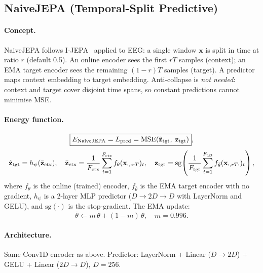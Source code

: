 \documentclass[11pt,a4paper]{article}
\begin{document}
\subsection{NaiveJEPA (Temporal-Split Predictive)}
\label{sec:math_naive}

\paragraph{Concept.}
NaiveJEPA follows I-JEPA~\cite{ijepa} applied to EEG: a single window $\mathbf{x}$
is split in time at ratio $r$ (default 0.5).  An online encoder sees the first $r T$
samples (context); an EMA target encoder sees the remaining $(1-r)T$ samples (target).
A predictor maps context embedding to target embedding.  Anti-collapse is \emph{not needed}:
context and target cover disjoint time spans, so constant predictions cannot minimise MSE.

\paragraph{Energy function.}
\begin{equation}
  \boxed{E_{\mathrm{NaiveJEPA}} = L_{\mathrm{pred}} = \mathrm{MSE}(\hat{\mathbf{z}}_{\rm tgt},\;
    \mathbf{z}_{\rm tgt})},
\end{equation}
\begin{equation}
  \hat{\mathbf{z}}_{\rm tgt} = h_\psi(\bar{\mathbf{z}}_{\rm ctx}), \quad
  \bar{\mathbf{z}}_{\rm ctx} = \frac{1}{F_{\rm ctx}}\sum_{t=1}^{F_{\rm ctx}}
    f_\theta(\mathbf{x}_{:,:rT})_t, \quad
  \mathbf{z}_{\rm tgt} = \mathrm{sg}\!\left(
    \frac{1}{F_{\rm tgt}}\sum_{t=1}^{F_{\rm tgt}}
    f_{\bar\theta}(\mathbf{x}_{:,rT:})_t\right),
\end{equation}
where $f_\theta$ is the online (trained) encoder, $f_{\bar\theta}$ is the EMA target
encoder with no gradient, $h_\psi$ is a 2-layer MLP predictor
($D\to 2D\to D$ with LayerNorm and GELU), and $\mathrm{sg}(\cdot)$ is the stop-gradient.
The EMA update:
\begin{equation}
  \bar\theta \leftarrow m\,\bar\theta + (1-m)\,\theta, \quad m = 0.996.
\end{equation}

\paragraph{Architecture.} Same Conv1D encoder as above.  Predictor: LayerNorm + Linear
($D \to 2D$) + GELU + Linear ($2D \to D$), $D{=}256$.
\end{document}

